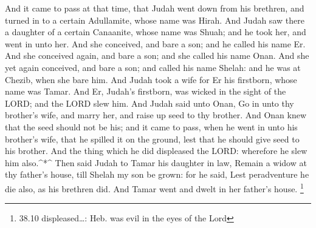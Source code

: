  And it came to pass at that time, that Judah went down from
his brethren, and turned in to a certain Adullamite, whose name was
Hirah.  And Judah saw there a daughter of a certain
Canaanite, whose name was Shuah; and he took her, and went in unto her.
 And she conceived, and bare a son; and he called his name
Er.  And she conceived again, and bare a son; and she called
his name Onan.  And she yet again conceived, and bare a son;
and called his name Shelah: and he was at Chezib, when she bare him.
 And Judah took a wife for Er his firstborn, whose name was
Tamar.  And Er, Judah's firstborn, was wicked in the sight
of the LORD; and the LORD slew him.  And Judah said unto
Onan, Go in unto thy brother's wife, and marry her, and raise up seed to
thy brother.  And Onan knew that the seed should not be his;
and it came to pass, when he went in unto his brother's wife, that he
spilled it on the ground, lest that he should give seed to his brother.
 And the thing which he did displeased the LORD: wherefore
he slew him also.\^{}*\^{}  Then said Judah to Tamar his
daughter in law, Remain a widow at thy father's house, till Shelah my
son be grown: for he said, Lest peradventure he die also, as his
brethren did. And Tamar went and dwelt in her father's house.
\footnote{38.10 displeased\ldots: Heb. was evil in the eyes of the Lord}

